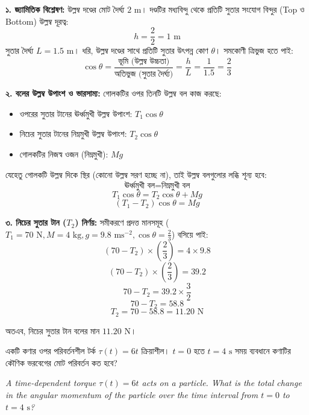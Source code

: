\documentclass[12pt, a4paper]{article}
\begin{document}
\begin{tcolorbox}[solutionbox={সমাধান (Solution)}]
\noindent
\textbf{১. জ্যামিতিক বিশ্লেষণ:}
উল্লম্ব দণ্ডের মোট দৈর্ঘ্য $2\text{ m}$। দণ্ডটির মধ্যবিন্দু থেকে প্রতিটি সুতার সংযোগ বিন্দুর (Top ও Bottom) উল্লম্ব দূরত্ব:
$$h = \frac{2}{2} = 1\text{ m}$$
সুতার দৈর্ঘ্য $L = 1.5\text{ m}$। 
ধরি, উল্লম্ব দণ্ডের সাথে প্রতিটি সুতার উৎপন্ন কোণ $\theta$। সমকোণী ত্রিভুজ হতে পাই:
$$\cos\theta = \frac{\text{ভূমি (উল্লম্ব উচ্চতা)}}{\text{অতিভুজ (সুতার দৈর্ঘ্য)}} = \frac{h}{L} = \frac{1}{1.5} = \frac{2}{3}$$

\vspace{0.5em}
\textbf{২. বলের উল্লম্ব উপাংশ ও ভারসাম্য:}
গোলকটির ওপর তিনটি উল্লম্ব বল কাজ করছে:
\begin{itemize}[leftmargin=1.5em, itemsep=0.2em]
    \item ওপরের সুতার টানের ঊর্ধ্বমুখী উল্লম্ব উপাংশ: $T_1 \cos\theta$
    \item নিচের সুতার টানের নিম্নমুখী উল্লম্ব উপাংশ: $T_2 \cos\theta$
    \item গোলকটির নিজস্ব ওজন (নিম্নমুখী): $Mg$
\end{itemize}
যেহেতু গোলকটি উল্লম্ব দিকে স্থির (কোনো উল্লম্ব সরণ হচ্ছে না), তাই উল্লম্ব বলগুলোর লব্ধি শূন্য হবে:
$$\text{ঊর্ধ্বমুখী বল} = \text{নিম্নমুখী বল}$$
$$T_1 \cos\theta = T_2 \cos\theta + Mg$$
$$(T_1 - T_2) \cos\theta = Mg$$

\vspace{0.5em}
\textbf{৩. নিচের সুতার টান ($T_2$) নির্ণয়:}
সমীকরণে প্রদত্ত মানসমূহ ($T_1 = 70\text{ N}, M = 4\text{ kg}, g = 9.8\text{ ms}^{-2}, \cos\theta = \frac{2}{3}$) বসিয়ে পাই:
$$(70 - T_2) \times \left(\frac{2}{3}\right) = 4 \times 9.8$$
$$(70 - T_2) \times \left(\frac{2}{3}\right) = 39.2$$
$$70 - T_2 = 39.2 \times \frac{3}{2}$$
$$70 - T_2 = 58.8$$
$$T_2 = 70 - 58.8 = 11.20\text{ N}$$

অতএব, নিচের সুতার টান বলের মান $11.20\text{ N}$।
\end{tcolorbox}
\vspace{1em}
\begin{tcolorbox}[questionbox={প্রশ্ন (Question) 25}]
\noindent
একটি কণার ওপর পরিবর্তনশীল টর্ক $\tau(t) = 6t$ ক্রিয়াশীল। $t = 0$ হতে $t = 4\text{ s}$ সময় ব্যবধানে কণাটির কৌণিক ভরবেগের মোট পরিবর্তন কত হবে?

\vspace{0.8em}
\begin{english}
\noindent\textit{\color{darkgray}
A time-dependent torque $\tau(t) = 6t$ acts on a particle. What is the total change in the angular momentum of the particle over the time interval from $t = 0$ to $t = 4\text{ s}$?
}
\end{english}
\end{tcolorbox}
\end{document}

